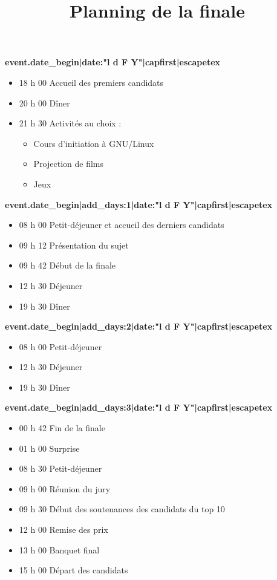 \documentclass[a4paper,11pt]{prologin}
\title{Planning de la finale}
\begin{document}
\textbf{ {{ event.date_begin|date:"l d F Y"|capfirst|escapetex }} }

\begin{itemize}
    \item 18 h 00                 Accueil des premiers candidats
    \item 20 h 00                 Dîner
    \item 21 h 30                 Activités au choix :
    \begin{itemize}
	\item[~]            Cours d'initiation à GNU/Linux
	\item[~]            Projection de films
	\item[~]            Jeux
    \end{itemize}
\end{itemize}

\vspace{0.3cm}
\textbf{ {{ event.date_begin|add_days:1|date:"l d F Y"|capfirst|escapetex }} }

\begin{itemize}
    \item 08 h 00                 Petit-déjeuner et accueil des derniers candidats
    \item 09 h 12                 Présentation du sujet
    \item 09 h 42                 Début de la finale
    \item 12 h 30                 Déjeuner
    \item 19 h 30                 Dîner
\end{itemize}

\vspace{0.3cm}
\textbf{ {{ event.date_begin|add_days:2|date:"l d F Y"|capfirst|escapetex }} }

\begin{itemize}
    \item 08 h 00                 Petit-déjeuner
    \item 12 h 30                 Déjeuner
    \item 19 h 30                 Dîner
\end{itemize}

\vspace{0.3cm}
\textbf{ {{ event.date_begin|add_days:3|date:"l d F Y"|capfirst|escapetex }} }

\begin{itemize}
    \item 00 h 42                 Fin de la finale
    \item 01 h 00                 Surprise
    \item 08 h 30                 Petit-déjeuner
    \item 09 h 00                 Réunion du jury
    \item 09 h 30                 Début des soutenances des candidats du top 10
    \item 12 h 00                 Remise des prix
    \item 13 h 00                 Banquet final
    \item 15 h 00                 Départ des candidats
\end{itemize}
\end{document}

